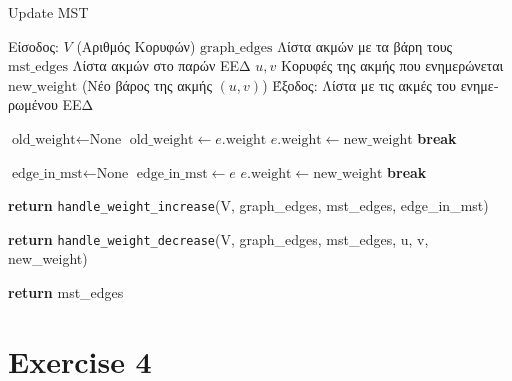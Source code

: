 \documentclass{article}
\begin{document}
\begin{algorithm}[H]
\caption{Update MST }
\begin{algorithmic}[1]
\State \textgreek{Είσοδος: }
\State \quad \( V \) (\textgreek{Αριθμός Κορυφών})
\State \quad \( \text{graph\_edges} \) \textgreek{Λίστα ακμών με τα βάρη τους}
\State \quad \( \text{mst\_edges} \) \textgreek{Λίστα ακμών στο παρών ΕΕΔ}
\State \quad \( u, v \) \textgreek{Κορυφές της ακμής που ενημερώνεται}
\State \quad \( \text{new\_weight} \) \textgreek{ (Νέο βάρος της ακμής \( (u, v) \))}
\State \textgreek{Έξοδος: } \textgreek{Λίστα με τις ακμές του ενημερωμένου ΕΕΔ}

\State \( \text{old\_weight} \gets \text{None} \)
        \State \( \text{old\_weight} \gets e.\text{weight} \)
        \State \( e.\text{weight} \gets \text{new\_weight} \)
        \State \textbf{break}
    \EndIf
\EndFor

    \State {}  
\EndIf

\State \( \text{edge\_in\_mst} \gets \text{None} \)
        \State \( \text{edge\_in\_mst} \gets e \)
        \State \( e.\text{weight} \gets \text{new\_weight} \)
        \State \textbf{break}
    \EndIf
\EndFor

    \State \textbf{return} \texttt{handle\_weight\_increase}(V, graph\_edges, mst\_edges, edge\_in\_mst)
\EndIf

    \State \textbf{return} \texttt{handle\_weight\_decrease}(V, graph\_edges, mst\_edges, u, v, new\_weight)
\EndIf

\State \textbf{return} mst\_edges
\end{algorithmic}
\end{algorithm}





\section*{Exercise 4}
\end{document}
